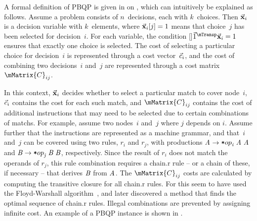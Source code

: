 A formal definition of \gls{PBQP} is given in
 on ,
which can intuitively be explained as follows.
%
Assume a problem consists of $n$~decisions, each with $k$~choices.
%
Then $\mVector{\mVar{x}}_i$ is a \gls{decision variable} with $k$~elements,
where \mbox{$\mVector{\mVar{x}}_i[j] = 1$} means that choice~$j$ has been
selected for decision~$i$\hspace{-.8pt}.
%
For each \gls{variable}, the condition
\raisebox{0pt}[\height-2pt]{$\mVector{1}^{\mTransp} \mVector{\mVar{x}}_i = 1$}
ensures that exactly one choice is selected.
%
The cost of selecting a particular choice for decision~$i$ is represented
through a cost vector~$\vec{c}_i$, and the cost of combining two
decisions~$i$ and~$j$ are represented through a cost matrix~$\mMatrix{C}_{ij}$.

In this context, $\mVector{\mVar{x}}_i$ decides whether to select a particular
\gls{match} to cover \gls{node}~$i$, $\vec{c}_i$ contains the cost for each
such \gls{match}, and $\mMatrix{C}_{ij}$ contains the cost of additional
\glspl{instruction} that may need to be selected due to certain combinations of
\glspl{match}.
%
For example, assume two nodes~$i$ and~$j$ where $j$ depends on
$i$\hspace{-.8pt}.
%
Assume further that the \glspl{instruction} are represented as a
 \gls{machine grammar}, and that~$i$ and~$j$ can be
covered using two \glspl{rule}, $r_i$ and $r_j$, with \glspl{production}
\mbox{$\mNT{A} \rightarrow \irCode*{op}_{\mathit{i}} \; \mNT{A} \; \mNT{A}$} and
\mbox{$\mNT{B} \rightarrow \irCode*{op}_{\mathit{j}} \; \mNT{B} \; \mNT{B}$},
respectively.
%
Since the result of $r_i$ does not match the operands of $r_j$, this \gls{rule}
combination requires a \gls{chain.r} \gls{rule} -- or a chain of these, if
necessary -- that derives $\mNT{B}$ from $\mNT{A}$.
%
The $\mMatrix{C}_{ij}$ costs are calculated by computing the \gls{transitive
  closure} for all \gls{chain.r} \glspl{rule}.
%
For this \citeauthor{EcksteinEtAl:2003} seem to have used the Floyd-Warshall
algorithm~\cite{Floyd:1962}, and \textcite{SchaeferScholz:2007} later discovered
a method that finds the optimal sequence of \gls{chain.r} \glspl{rule}.
%
Illegal combinations are prevented by assigning infinite cost.
%
An example of a \gls{PBQP} instance is shown in .

